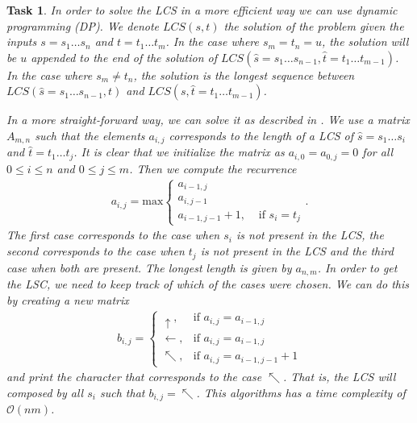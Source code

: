 \documentclass[11pt]{article} %
\theoremstyle{problemstyle}
\newtheorem{exercise}{Task}	%
\theoremstyle{problemstyle}
\renewcommand*{\O}{\mathcal{O}}
\begin{document}
\begin{exercise}  %
In order to solve the LCS in a more efficient way we can use dynamic programming (DP). We denote $LCS(s,t)$ the solution of the problem given the inputs $s=s_1\dots s_n$ and $t=t_1\dots t_m$. In the case where $s_m = t_n = u$, the solution will be $u$ appended to the end of the solution of $LCS(\hat{s}=s_1\dots s_{n-1}, \hat{t}=t_1\dots t_{m-1})$. In the case where $s_m \neq t_n$, the solution is the longest sequence between $LCS(\hat{s}=s_1\dots s_{n-1}, t)$ and $LCS(s, \hat{t}=t_1\dots t_{m-1})$. 

In a more straight-forward way, we can solve it as described in \cite{jones}. We use a matrix $A_{m,n}$ such that the elements $a_{i,j}$ corresponds to the length of a LCS of $\hat{s}=s_1\dots s_{i}$ and $\hat{t}=t_1\dots t_{j}$. It is clear that we initialize the matrix as $a_{i,0} = a_{0,j} = 0$ for all $0\leq i \leq n$ and $0\leq j \leq m$. Then we compute the recurrence
\begin{align*}
		a_{i,j} = \text{max}
	\begin{cases}
	a_{i-1,j} &\\
	a_{i,j-1} &\\
	a_{i-1,j-1}+1, &\text{ if } s_i=t_j 
	\end{cases}
	\text{.}
\end{align*}
The first case corresponds to the case when $s_i$ is not present in the LCS, the second corresponds to the case when $t_j$ is not present in the LCS and the third case when both are present. The longest length is given by $a_{n,m}$. In order to get the LSC, we need to keep track of which of the cases were chosen. We can do this by creating a new matrix 
\begin{align*}
	b_{i,j} =
	\begin{cases}
	\uparrow, &\text{if } a_{i,j}=a_{i-1,j} \\
	\leftarrow, &\text{if } a_{i,j}=a_{i-1,j} \\
	\nwarrow, &\text{if } a_{i,j}=a_{i-1,j-1} +1
	\end{cases}
\end{align*}
and print the character that corresponds to the case $\nwarrow$. That is, the LCS will composed by all $s_i$ such that $b_{i,j}= \nwarrow$. This algorithms has a time complexity of $\O(nm)$.
\end{exercise}
\end{document}

